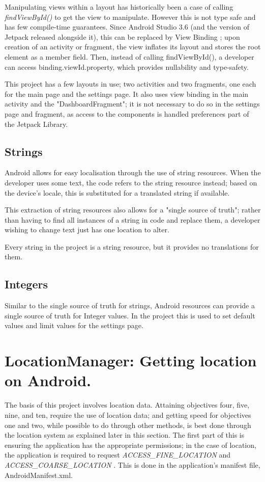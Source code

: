 \documentclass[11pt, a4paper, notitlepage]{report}
\begin{document}
Manipulating views within a layout has historically been a case of calling \textit{findViewById()} to get the view to manipulate. However this is not type safe and has few compile-time guarantees. Since Android Studio 3.6 (and the version of Jetpack released alongside it), this can be replaced by View Binding \citep{viewBindingAndroid}; upon creation of an activity or fragment, the view inflates its layout and stores the root element as a member field. Then, instead of calling findViewById(), a developer can access binding.viewId.property, which provides nullability and type-safety.

This project has a few layouts in use; two activities and two fragments, one each for the main page and the settings page. It also uses view binding in the main activity and the "DashboardFragment"; it is not necessary to do so in the settings page and fragment, as access to the components is handled preferences part of the Jetpack Library.

\subsection{Strings}
Android allows for easy localisation through the use of string resources. When the developer uses some text, the code refers to the string resource instead; based on the device's locale, this is substituted for a translated string if available.

This extraction of string resources also allows for a "single source of truth"; rather than having to find all instances of a string in code and replace them, a developer wishing to change text just has one location to alter.

Every string in the project is a string resource, but it provides no translations for them.

\subsection{Integers}
Similar to the single source of truth for strings, Android resources can provide a single source of truth for Integer values. In the project this is used to set default values and limit values for the settings page.

\section{LocationManager: Getting location on Android.}
The basis of this project involves location data. Attaining objectives four, five, nine, and ten, require the use of location data; and getting speed for objectives one and two, while possible to do through other methods, is best done through the location system as explained later in this section. The first part of this is ensuring the application has the appropriate permissions; in the case of location, the application is required to request \textit{ACCESS\_FINE\_LOCATION} and \textit{ACCESS\_COARSE\_LOCATION} \citep{permissionsAndroid}. This is done in the application's manifest file, AndroidManifest.xml.
\end{document}
